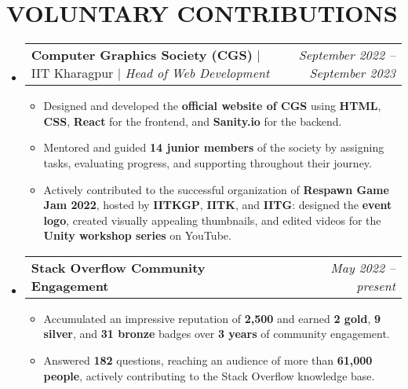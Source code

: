 \documentclass[letterpaper,9pt]{article}
\makeatletter
\newcommand{\resumeItem}[1]{
  \item\small{
    {#1 \vspace{-1pt}}
  }
}
\newcommand{\resumeWorkExpHeading}[4]{
  \vspace{-2pt}\item
  \begin{tabular*}{1.0\textwidth}[t]{l@{\extracolsep{\fill}}r}
    \textbf{#1} $\mid$ {#2} $\mid$ \textit{#3} & \textit{\small #4} \\
  \end{tabular*}\vspace{-7pt}
}
\newcommand{\resumeProjectHeading}[2]{
  \vspace{-2pt}\item
  \begin{tabular*}{1.0\textwidth}[t]{l@{\extracolsep{\fill}}r}
    \textbf{#1} & \textit{\small #2} \\
  \end{tabular*}\vspace{-7pt}
}
\newcommand{\resumeSubHeadingListStart}{\begin{itemize}[leftmargin=0.0in, label={}]}
\newcommand{\resumeSubHeadingListEnd}{\end{itemize}}
\newcommand{\resumeItemListStart}{\begin{itemize}[leftmargin=10pt, labelsep=5pt]}
\newcommand{\resumeItemListEnd}{\end{itemize}\vspace{-5pt}}
\makeatother
\begin{document}
\section{VOLUNTARY CONTRIBUTIONS}
\resumeSubHeadingListStart

\resumeWorkExpHeading
{Computer Graphics Society (CGS)}{IIT Kharagpur}{Head of Web Development}
{September 2022 -- September 2023}
\resumeItemListStart
\resumeItem{Designed and developed the \textbf{official website of CGS} using \textbf{HTML}, \textbf{CSS}, \textbf{React} for the frontend, and \textbf{Sanity.io} for the backend.}
\resumeItem{Mentored and guided \textbf{14 junior members} of the society by assigning tasks, evaluating progress, and supporting throughout their journey.}
\resumeItem{Actively contributed to the successful organization of \textbf{Respawn Game Jam 2022}, hosted by \textbf{IITKGP}, \textbf{IITK}, and \textbf{IITG}: designed the \textbf{event logo}, created visually appealing thumbnails, and edited videos for the \textbf{Unity workshop series} on YouTube.}
\resumeItemListEnd

\resumeProjectHeading
{Stack Overflow Community Engagement}{May 2022 -- present}
\resumeItemListStart
\resumeItem{Accumulated an impressive reputation of \textbf{2,500} and earned \textbf{2 gold}, \textbf{9 silver}, and \textbf{31 bronze} badges over \textbf{3 years} of community engagement.}
\resumeItem{Answered \textbf{182} questions, reaching an audience of more than \textbf{61,000 people}, actively contributing to the Stack Overflow knowledge base.}
\resumeItemListEnd

\resumeSubHeadingListEnd


\end{document}
